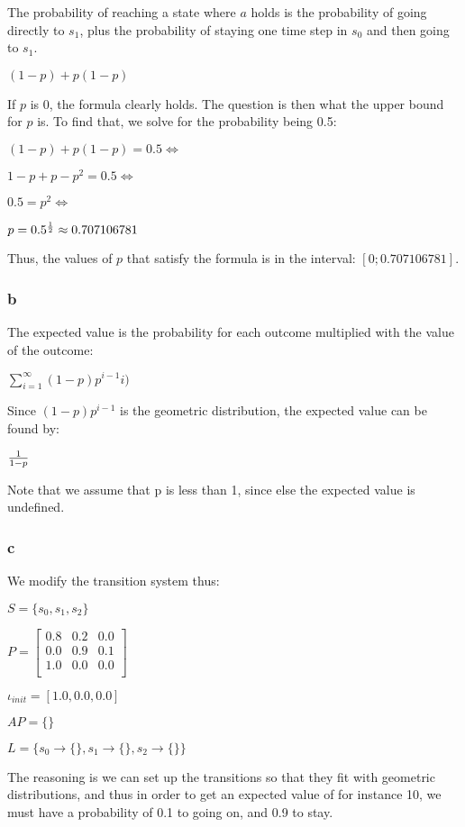 The probability of reaching a state where $a$ holds is
the probability of going directly to $s_1$,
plus the probability of staying one time step
in $s_0$ and then going to $s_1$.

$(1-p) + p(1-p)$

If $p$ is 0, the formula clearly holds.
The question is then what the upper bound for $p$ is.
To find that, we solve for the probability being 0.5:

$(1-p) + p(1-p) = 0.5 \Leftrightarrow$

$1 - p + p - p^2 = 0.5 \Leftrightarrow$

$0.5 = p^2 \Leftrightarrow$

$p = 0.5^{1 \over 2} \approx 0.707106781$

Thus, the values of $p$ that satisfy the formula is in the interval: $[0; 0.707106781]$.

\subsubsection{b}

The expected value is the probability for each outcome multiplied with the value of the outcome:

$\sum_{i=1}^\infty (1-p)p^{i-1}i )$

Since $(1-p)p^{i-1}$ is the geometric distribution,
the expected value can be found by:

$1 \over {1 - p}$

Note that we assume that p is less than 1, since else the expected value is undefined.

\subsubsection{c}

We modify the transition system thus:

$S = \{s_0, s_1, s_2\}$

$
P = \begin{bmatrix}
0.8 & 0.2 & 0.0 \\
0.0 & 0.9 & 0.1 \\
1.0 & 0.0 & 0.0 \\
\end{bmatrix}
$

$\iota_{init} = [1.0, 0.0, 0.0]$

$AP = \{\}$

$L = \{s_0 \to \{\}, s_1 \to \{\}, s_2 \to \{\}\}$

The reasoning is we can set up the transitions so that they fit with geometric distributions,
and thus in order to get an expected value of for instance 10,
we must have a probability of 0.1 to going on, and 0.9 to stay.

